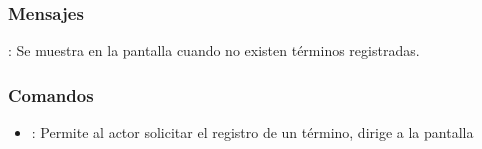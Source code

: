 \subsubsection{Mensajes}

\begin{Citemize}
	\item {}: Se muestra en la pantalla  cuando no existen términos registradas.
\end{Citemize}


\label{IU11A}
\subsubsection{Comandos}
\begin{itemize}
	\item {}: Permite al actor solicitar el registro de un término, dirige a la pantalla 
\end{itemize}